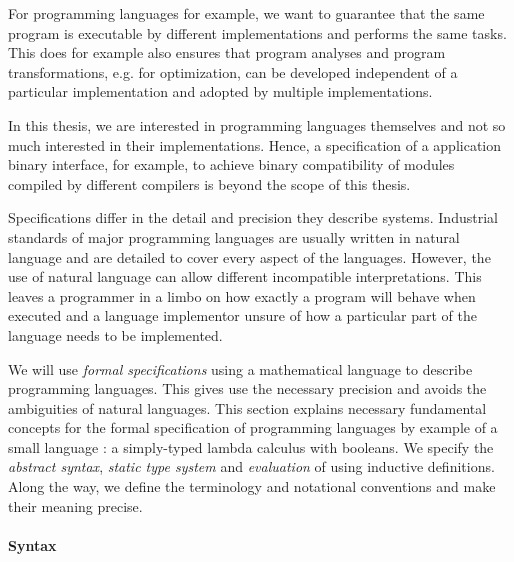 {For programming languages for example, we want to guarantee that the same
program is executable by different implementations and performs the same tasks.
This does for example also ensures that program analyses and program
transformations, e.g. for optimization, can be developed independent of a
particular implementation and adopted by multiple implementations.

In this thesis, we are interested in programming languages themselves and not so
much interested in their implementations. Hence, a specification of a
application binary interface, for example, to achieve binary compatibility of
modules compiled by different compilers is beyond the scope of this thesis.

Specifications differ in the detail and precision they describe systems.
Industrial standards of major programming languages are usually written in
natural language and are detailed to cover every aspect of the languages.
However, the use of natural language can allow different incompatible
interpretations. This leaves a programmer in a limbo on how exactly a program
will behave when executed and a language implementor unsure of how a particular
part of the language needs to be implemented.

We will use \emph{formal specifications} using a mathematical language to
describe programming languages. This gives use the necessary precision and
avoids the ambiguities of natural languages. This section explains necessary
fundamental concepts for the formal specification of programming languages by
example of a small language \stlcbool: a simply-typed lambda calculus with
booleans. We specify the \emph{abstract syntax}, \emph{static type system} and
\emph{evaluation} of \stlcbool using inductive definitions. Along the way, we
define the terminology and notational conventions and make their meaning
precise.

\paragraph{Syntax}

}
